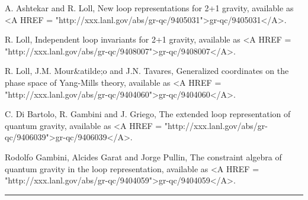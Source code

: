 A. Ashtekar and R. Loll,
New loop representations for 2+1 gravity, 
available as 
<A HREF = "http://xxx.lanl.gov/abs/gr-qc/9405031">gr-qc/9405031</A>.  

R. Loll, 
Independent loop invariants for 2+1 gravity, available as
<A HREF = "http://xxx.lanl.gov/abs/gr-qc/9408007">gr-qc/9408007</A>.  

R. Loll, J.M. Mour&atilde;o and J.N. Tavares, 
Generalized coordinates on the phase space of Yang-Mills theory, 
available as <A HREF = "http://xxx.lanl.gov/abs/gr-qc/9404060">gr-qc/9404060</A>.  

C. Di Bartolo, R. Gambini and J. Griego, 
The extended loop representation of quantum gravity, 
available as <A HREF = "http://xxx.lanl.gov/abs/gr-qc/9406039">gr-qc/9406039</A>.  

Rodolfo Gambini, Alcides Garat and Jorge Pullin, 
The constraint algebra of quantum gravity in the loop representation, 
available as <A HREF = "http://xxx.lanl.gov/abs/gr-qc/9404059">gr-qc/9404059</A>.  


\par\noindent\rule{\textwidth}{0.4pt}
